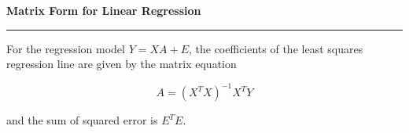 \nopagenumbers
{\bf Matrix Form for Linear Regression}
\vskip 1mm
\hrule

\vskip 6pt
For the regression model $Y=XA+E$, the coefficients of the least squares regression line are given by the matrix equation

$$A=(X^TX)^{-1}X^TY$$

and the sum of squared error is $E^TE$.

\vfill\eject
\bye
